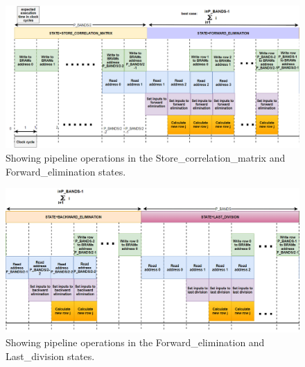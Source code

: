\begin{figure}[H]
\centering
   \includegraphics[scale=0.5]{images/estimation_execution_time/pipeline_inverse_matrix_part_1.PNG}
  \caption{Showing pipeline operations in the Store\_correlation\_matrix and Forward\_elimination states.  } 
  \label{fig:pipeline_inverse_part_1}
\end{figure}

\begin{figure}[H]
\centering
   \includegraphics[scale=0.5]{images/estimation_execution_time/pipeline_inverse_matrix_part_2.PNG}
  \caption{Showing pipeline operations in the Forward\_elimination and Last\_division states.  } 
  \label{fig:pipeline_inverse_part_2}
\end{figure}

